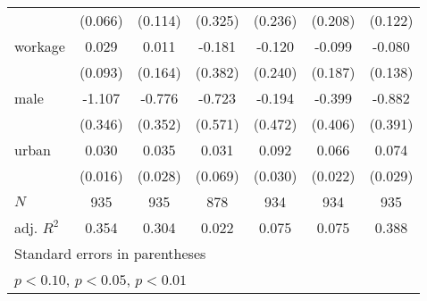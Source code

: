 {\begin{tabular}{l*{6}{c}}
            &     (0.066)         &     (0.114)         &     (0.325)         &     (0.236)         &     (0.208)         &     (0.122)         \\
[1em]
workage     &       0.029         &       0.011         &      -0.181         &      -0.120         &      -0.099         &      -0.080         \\
            &     (0.093)         &     (0.164)         &     (0.382)         &     (0.240)         &     (0.187)         &     (0.138)         \\
[1em]
male        &      -1.107\sym{***}&      -0.776\sym{**} &      -0.723         &      -0.194         &      -0.399         &      -0.882\sym{**} \\
            &     (0.346)         &     (0.352)         &     (0.571)         &     (0.472)         &     (0.406)         &     (0.391)         \\
[1em]
urban       &       0.030\sym{*}  &       0.035         &       0.031         &       0.092\sym{***}&       0.066\sym{***}&       0.074\sym{**} \\
            &     (0.016)         &     (0.028)         &     (0.069)         &     (0.030)         &     (0.022)         &     (0.029)         \\
\hline
\(N\)       &         935         &         935         &         878         &         934         &         934         &         935         \\
adj. \(R^{2}\)&       0.354         &       0.304         &       0.022         &       0.075         &       0.075         &       0.388         \\
\hline\hline
\multicolumn{7}{l}{\footnotesize Standard errors in parentheses}\\
\multicolumn{7}{l}{\footnotesize \sym{*} \(p<0.10\), \sym{**} \(p<0.05\), \sym{***} \(p<0.01\)}\\
\end{tabular}
}
